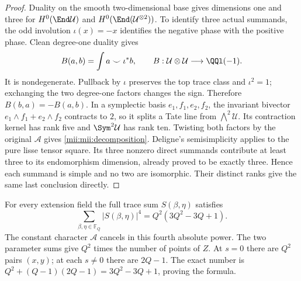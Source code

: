 \documentclass[11pt,a4paper]{article}
\begin{document}
\begin{proof}
Duality on the smooth two-dimensional base gives dimensions one and
three for $H^0(\End\mathcal U)$ and
$H^0(\End(\mathcal U^{\otimes2}))$. To identify three actual
summands, the odd involution $\iota(x)=-x$ identifies the negative
phase with the positive phase. Clean degree-one duality gives
\[
 B(a,b)=\int a\smile\iota^*b,
 \qquad B:\mathcal U\otimes\mathcal U\longrightarrow\QQl(-1).
\]
It is nondegenerate. Pullback by $\iota$ preserves the top trace class
and $\iota^2=1$; exchanging the two degree-one factors changes the
sign. Therefore $B(b,a)=-B(a,b)$. In a symplectic basis
$e_1,f_1,e_2,f_2$, the invariant bivector
$e_1\wedge f_1+e_2\wedge f_2$ contracts to $2$, so it splits a
Tate line from $\bigwedge^2\mathcal U$. Its contraction kernel has
rank five and $\Sym^2\mathcal U$ has rank ten. Twisting both factors
by the original $\mathcal A$ gives \eqref{mii:mii:decomposition}.
Deligne's semisimplicity applies to the pure lisse tensor square.
Its three nonzero direct summands contribute at least three to its
endomorphism dimension, already proved to be exactly three. Hence
each summand is simple and no two are isomorphic. Their distinct
ranks give the same last conclusion directly.
\end{proof}

For every extension field the full trace sum $S(\beta,\eta)$ satisfies
\begin{equation}\tag{MII13}\label{mii:mii:moment4}
 \sum_{\beta,\eta\in\mathbb F_Q}|S(\beta,\eta)|^4
       =Q^2(3Q^2-3Q+1).
\end{equation}
The constant character $\mathcal A$ cancels in this fourth absolute
power. The two parameter sums give $Q^2$ times the number of points
of $Z$. At $s=0$ there are $Q^2$ pairs $(x,y)$; at each $s\ne0$
there are $2Q-1$. The exact number is
$Q^2+(Q-1)(2Q-1)=3Q^2-3Q+1$, proving the formula.
\end{document}
